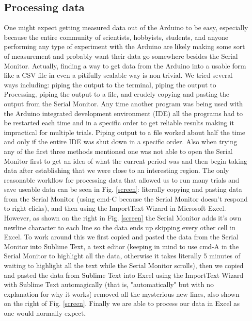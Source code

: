 \documentclass[11pt]{article}
\begin{document}
\subsection{Processing data}
One might expect getting measured data out of the Arduino to be easy, especially because the entire community of scientists, hobbyists, students, and anyone performing any type of experiment with the Arduino are likely making some sort of measurement and probably want their data go somewhere besides the Serial Monitor. Actually, finding a way to get data from the Arduino into a usable form like a CSV file in even a pitifully scalable way is non-trivial. We tried several ways including: piping the output to the terminal, piping the output to Processing, piping the output to a file, and crudely copying and pasting the output from the Serial Monitor. Any time another program was being used with the Arduino integrated development environment (IDE) all the programs had to be restarted each time and in a specific order to get reliable results making it impractical for multiple trials. Piping output to a file worked about half the time and only if the entire IDE was shut down in a specific order. Also when trying any of the first three methods mentioned one was not able to open the Serial Monitor first to get an idea of what the current period was and then begin taking data after establishing that we were close to an interesting region. The only reasonable workflow for processing data that allowed us to run many trials and save useable data can be seen in Fig. \ref{screen}: literally copying and pasting data from the Serial Monitor (using cmd-C because the Serial Monitor doesn't respond to right clicks), and then using the ImportText Wizard in Microsoft Excel. However, as shown on the right in Fig. \ref{screen} the Serial Monitor adds it's own newline character to each line so the data ends up skipping every other cell in Excel. To work around this we first copied and pasted the data from the Serial Monitor into Sublime Text, a text editor (keeping in mind to use cmd-A in the Serial Monitor to highlight all the data, otherwise it takes literally 5 minutes of waiting to highlight all the text while the Serial Monitor scrolls), then we copied and pasted the data from Sublime Text into Excel using the ImportText Wizard with Sublime Text automagically (that is, "automatically" but with no explanation for why it works) removed all the mysterious new lines, also shown on the right of Fig. \ref{screen}. Finally we are able to process our data in Excel as one would normally expect.
\end{document}
